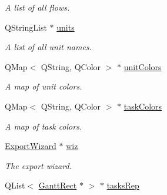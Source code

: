 \begin{DoxyCompactItemize}
\begin{DoxyCompactList}\small\item\em A list of all flows. \end{DoxyCompactList}\item 
\hypertarget{class_main_window_aad7505c53a0ad219080b3c1b1d1ef1e6}{}Q\+String\+List $\ast$ \hyperlink{class_main_window_aad7505c53a0ad219080b3c1b1d1ef1e6}{units}\label{class_main_window_aad7505c53a0ad219080b3c1b1d1ef1e6}

\begin{DoxyCompactList}\small\item\em A list of all unit names. \end{DoxyCompactList}\item 
\hypertarget{class_main_window_a306683291c0136c9808f7026b37820e5}{}Q\+Map$<$ Q\+String, Q\+Color $>$ $\ast$ \hyperlink{class_main_window_a306683291c0136c9808f7026b37820e5}{unit\+Colors}\label{class_main_window_a306683291c0136c9808f7026b37820e5}

\begin{DoxyCompactList}\small\item\em A map of unit colors. \end{DoxyCompactList}\item 
\hypertarget{class_main_window_a26149cc7038562e5b7f1b4143a2f6a29}{}Q\+Map$<$ Q\+String, Q\+Color $>$ $\ast$ \hyperlink{class_main_window_a26149cc7038562e5b7f1b4143a2f6a29}{task\+Colors}\label{class_main_window_a26149cc7038562e5b7f1b4143a2f6a29}

\begin{DoxyCompactList}\small\item\em A map of task colors. \end{DoxyCompactList}\item 
\hypertarget{class_main_window_ab33d830736fa6da8353ba4c01e124642}{}\hyperlink{class_export_wizard}{Export\+Wizard} $\ast$ \hyperlink{class_main_window_ab33d830736fa6da8353ba4c01e124642}{wiz}\label{class_main_window_ab33d830736fa6da8353ba4c01e124642}

\begin{DoxyCompactList}\small\item\em The export wizard. \end{DoxyCompactList}\item 
\hypertarget{class_main_window_a71197b2944e569701672e2e8462d7805}{}Q\+List$<$ \hyperlink{class_gantt_rect}{Gantt\+Rect} $\ast$ $>$ $\ast$ \hyperlink{class_main_window_a71197b2944e569701672e2e8462d7805}{tasks\+Rep}\label{class_main_window_a71197b2944e569701672e2e8462d7805}


\end{DoxyCompactItemize}
